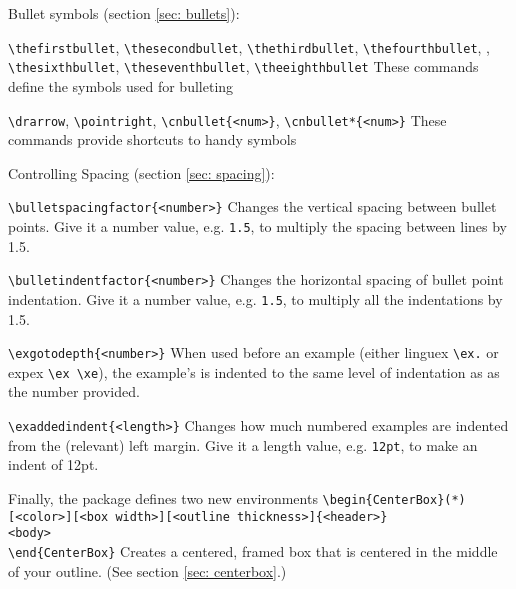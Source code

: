\documentclass[11pt]{article}
\begin{document}
\1 Bullet symbols (section \ref{sec: bullets}):
		
	\2 {\color{blue}\verb+\thefirstbullet+}, {\color{blue}\verb+\thesecondbullet+}, {\color{blue}\verb+\thethirdbullet+}, {\color{blue}\verb+\thefourthbullet+}, \linebreak{\color{blue}\verb+\thefifthbullet+}, {\color{blue}\verb+\thesixthbullet+}, {\color{blue}\verb+\theseventhbullet+}, {\color{blue}\verb+\theeighthbullet+}
		\3 These commands define the symbols used for bulleting

	\2 {\color{blue}\verb+\drarrow+}, {\color{blue}\verb+\pointright+}, {\color{blue}\verb+\cnbullet{<num>}+}, {\color{blue}\verb+\cnbullet*{<num>}+}
		\3 These commands provide shortcuts to handy symbols

\1 Controlling Spacing (section \ref{sec: spacing}):

	\2 {\color{blue}\verb+\bulletspacingfactor{<number>}+}
		\3 Changes the vertical spacing between bullet points. Give it a number value, e.g. \verb+1.5+, to multiply the spacing between lines by 1.5.

	\2 {\color{blue}\verb+\bulletindentfactor{<number>}+}
		\3 Changes the horizontal spacing of bullet point indentation. Give it a number value, e.g. \verb+1.5+, to multiply all the indentations by 1.5.


	\2 {\color{blue}\verb+\exgotodepth{<number>}+}
		\3 When used before an example (either linguex \verb+\ex.+ or expex \verb+\ex \xe+), the example's is indented to the same level of indentation as as the number provided.
		
	\2 {\color{blue}\verb+\exaddedindent{<length>}+}
		\3 Changes how much numbered examples are indented from the (relevant) left margin. Give it a length value, e.g. \verb+12pt+, to make an indent of 12pt.

\1 Finally, the package defines two new environments
	\2 {\color{blue}\verb+\begin{CenterBox}(*)[<color>][<box width>][<outline thickness>]{<header>}+\\\verb+<body>+\\\verb+\end{CenterBox}+}
		\3 Creates a centered, framed box that is centered in the middle of your outline. (See section \ref{sec: centerbox}.)
	
\end{document}
